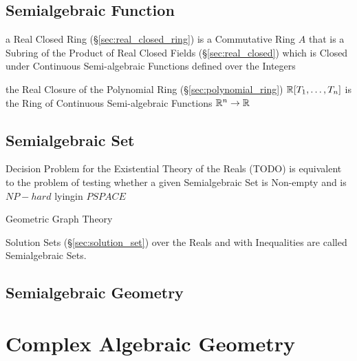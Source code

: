 \subsection{Semialgebraic Function}\label{sec:semialgebraic_function}

a Real Closed Ring (\S\ref{sec:real_closed_ring}) is a Commutative Ring $A$
that is a Subring of the Product of Real Closed Fields
(\S\ref{sec:real_closed}) which is Closed under Continuous Semi-algebraic
Functions defined over the Integers

the Real Closure of the Polynomial Ring (\S\ref{sec:polynomial_ring})
$\mathbb{R}[T_1,\ldots,T_n]$ is the Ring of Continuous Semi-algebraic Functions
$\mathbb{R}^n \rightarrow \mathbb{R}$



\subsection{Semialgebraic Set}\label{sec:semialgebraic_set}

Decision Problem for the Existential Theory of the Reals (TODO) is equivalent
to the problem of testing whether a given Semialgebraic Set is Non-empty and is
$NP-hard$ lyingin $PSPACE$

Geometric Graph Theory

Solution Sets (\S\ref{sec:solution_set}) over the Reals and with Inequalities
are called Semialgebraic Sets.



\subsection{Semialgebraic Geometry}\label{sec:semialgebraic_geometry}



\section{Complex Algebraic Geometry}
\label{sec:complex_algebraic_geometry}

